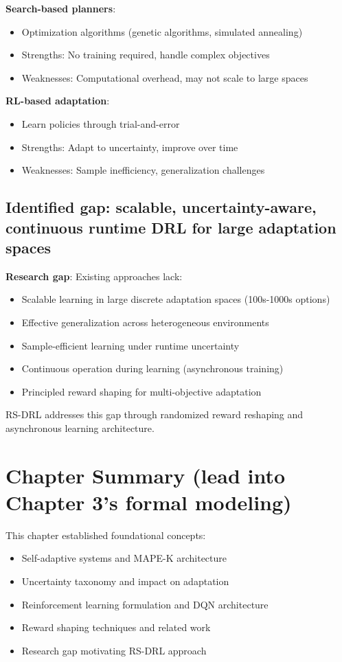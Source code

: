 \documentclass[11pt,a4paper]{article}
\begin{document}
\textbf{Search-based planners}:
\begin{itemize}
    \item Optimization algorithms (genetic algorithms, simulated annealing)
    \item Strengths: No training required, handle complex objectives
    \item Weaknesses: Computational overhead, may not scale to large spaces
\end{itemize}

\textbf{RL-based adaptation}:
\begin{itemize}
    \item Learn policies through trial-and-error
    \item Strengths: Adapt to uncertainty, improve over time
    \item Weaknesses: Sample inefficiency, generalization challenges
\end{itemize}

\subsection{Identified gap: scalable, uncertainty-aware, continuous runtime DRL for large adaptation spaces}

\textbf{Research gap}: Existing approaches lack:
\begin{itemize}
    \item Scalable learning in large discrete adaptation spaces (100s-1000s options)
    \item Effective generalization across heterogeneous environments
    \item Sample-efficient learning under runtime uncertainty
    \item Continuous operation during learning (asynchronous training)
    \item Principled reward shaping for multi-objective adaptation
\end{itemize}

RS-DRL addresses this gap through randomized reward reshaping and asynchronous learning architecture.

\section{Chapter Summary (lead into Chapter 3's formal modeling)}

This chapter established foundational concepts:
\begin{itemize}
    \item Self-adaptive systems and MAPE-K architecture
    \item Uncertainty taxonomy and impact on adaptation
    \item Reinforcement learning formulation and DQN architecture
    \item Reward shaping techniques and related work
    \item Research gap motivating RS-DRL approach
\end{itemize}
\end{document}
